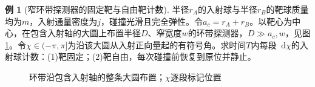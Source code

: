 \documentclass[11pt,openany,fontset=fandol]{ctexbook}
\theoremstyle{definition}\newtheorem{example}{例}[chapter]\newtheorem{exercise}{习题}[chapter]
\newcommand{\dd}{\mathop{}\!\mathrm d}\newcommand{\ee}{\mathrm e}\newcommand{\vct}[1]{\bm{#1}}
\begin{document}
\par\medskip\noindent\begin{minipage}{\textwidth}
\begin{example}[窄环带探测器的固定靶与自由靶计数]\label{mp1:rev:detector}
半径$r_A$的入射球与半径$r_B$的靶球质量均为$m$，入射通量密度为$j$，碰撞光滑且完全弹性。令$a_c=r_A+r_B$。以靶心为中心，在包含入射轴的大圆上布置半径$D$、窄宽度$w$的环带探测器，$D\gg a_c,w$，见图\ref{mp1:fig:rev:detector-q}。令$\chi\in(-\pi,\pi]$为沿该大圆从入射正向量起的有符号角。求时间$T$内每段$\dd\chi$的入射球计数：(1)靶固定；(2)靶自由，每次碰撞前恢复到原位并静止。
\end{example}

\begin{figure}[H]\centering
{}
\caption{环带沿包含入射轴的整条大圆布置；$\chi$逐段标记位置}\label{mp1:fig:rev:detector-q}
\end{figure}
\end{minipage}\par\medskip
\end{document}
